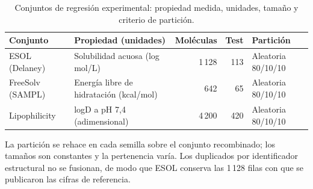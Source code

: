 %
%
%


\begin{table}[htbp]
  \centering
  \caption{Conjuntos de regresión experimental: propiedad medida, unidades,
           tamaño y criterio de partición.}
  \label{tab:a1-conjuntos}
  \small
  \begin{tabular}{@{}llrrl@{}}
    \toprule
    Conjunto & Propiedad (unidades) & Moléculas & Test & Partición \\
    \midrule
    ESOL (Delaney)   & Solubilidad acuosa (log mol/L)        & 1\,128 & 113 & Aleatoria 80/10/10 \\
    FreeSolv (SAMPL) & Energía libre de hidratación (kcal/mol) &   642 &  65 & Aleatoria 80/10/10 \\
    Lipophilicity    & logD a pH 7,4 (adimensional)          & 4\,200 & 420 & Aleatoria 80/10/10 \\
    \bottomrule
  \end{tabular}

  \vspace{0.5em}
  \begin{minipage}{0.92\textwidth}
    \footnotesize
    La partición se rehace en cada semilla sobre el conjunto recombinado; los tamaños
    son constantes y la pertenencia varía. Los duplicados por identificador estructural
    no se fusionan, de modo que ESOL conserva las 1\,128 filas con que se publicaron las
    cifras de referencia.
  \end{minipage}
\end{table}


